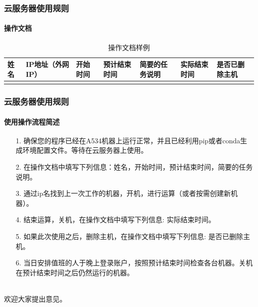\documentclass[10pt]{beamer}
\begin{document}
        \begin{frame}
            \frametitle{云服务器使用规则}
                \framesubtitle{操作文档}

                {\small
                \begin{table}[h]
                    \centering
                    \caption{操作文档样例}
                        \begin{tabular}{|p{}|p{}|p{}|p{}|p{}|p{}|p{}|}
                            \hline
                            姓名 & IP地址（外网IP） & 开始时间 & 预计结束时间 & 简要的任务说明 & 实际结束时间 & 是否已删除主机 \\
                            \hline
                            &&&&&& \\
                            \hline
                        \end{tabular}
                \end{table}
                }

        \end{frame}

        \begin{frame}
            \frametitle{云服务器使用规则}
                \framesubtitle{使用操作流程简述}
                    \begin{itemize}
                        \item [1. ]{确保您的程序已经在A534机器上运行正常，并且已经利用pip或者conda生成环境配置文件。等待在云服务器上使用。}
                        \item [2. ]{在操作文档中填写下列信息：姓名，开始时间，预计结束时间，简要的任务说明。}
                        \item [3. ]{通过ip名找到上一次工作的机器，开机，进行运算（或者按需创建新机器）。}
                        \item [4. ]{结束运算，关机，在操作文档中填写下列信息: 实际结束时间。}
                        \item [5. ]{如果此次使用之后，删除主机，在操作文档中填写下列信息: 是否已删除主机。}
                        \item [6. ]{当日安排值班的人于晚上登录账户，按照预计结束时间检查各台机器。关机在预计结束时间之后仍然运行的机器。}
                    \end{itemize}
                    \hspace*{\fill}\\
                    \centering
                    {\large 欢迎大家提出意见。}

        \end{frame}
\end{document}

